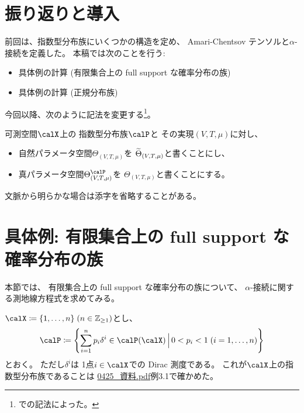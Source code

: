 \documentclass[report]{jlreq}
\begin{document}
%

%
\section*{振り返りと導入}

前回は、指数型分布族にいくつかの構造を定め、
Amari-Chentsov テンソルと$\alpha$-接続を定義した。
本稿では次のことを行う:

\begin{itemize}
    \item 具体例の計算 (有限集合上の full support な確率分布の族)
    \item 具体例の計算 (正規分布族)
\end{itemize}

今回以降、次のように記法を変更する\footnote{
    \cite{BN78}での記法によった。
}。

\begin{definition}[パラメータの空間の記法の変更]
    可測空間$\calX$上の
    指数型分布族$\calP$と
    その実現$(V, T, \mu)$に対し、
    \begin{itemize}
        \item 自然パラメータ空間$\Theta_{(V, T, \mu)}$を
            $\widetilde{\Theta}_{(V, T, \mu)}$と書くことにし、
        \item 真パラメータ空間$\Theta_{(V, T, \mu)}^\calP$を
            $\Theta_{(V, T, \mu)}$と書くことにする。
    \end{itemize}
    文脈から明らかな場合は添字を省略することがある。
\end{definition}

%
\section{具体例: 有限集合上の full support な確率分布の族}

本節では、
有限集合上の full support な確率分布の族について、
$\alpha$-接続に関する測地線方程式を求めてみる。

\begin{settings}
    $\calX \coloneqq \{ 1, \dots, n \} \; (n \in \Z_{\ge 1})$とし、
    \begin{equation}
        \calP \coloneqq \mybrace{
            \sum_{i = 1}^n p_i \delta^i
            \in \calP(\calX)
            \, \Big| \,
            0 < p_i < 1 \; (i = 1, \dots, n)
        }
    \end{equation}
    とおく。
    ただし$\delta^i$は
    1点$i \in \calX$での Dirac 測度である。
    これが$\calX$上の指数型分布族であることは
    \url{0425_資料.pdf}例3.1で確かめた。
\end{settings}
\end{document}
